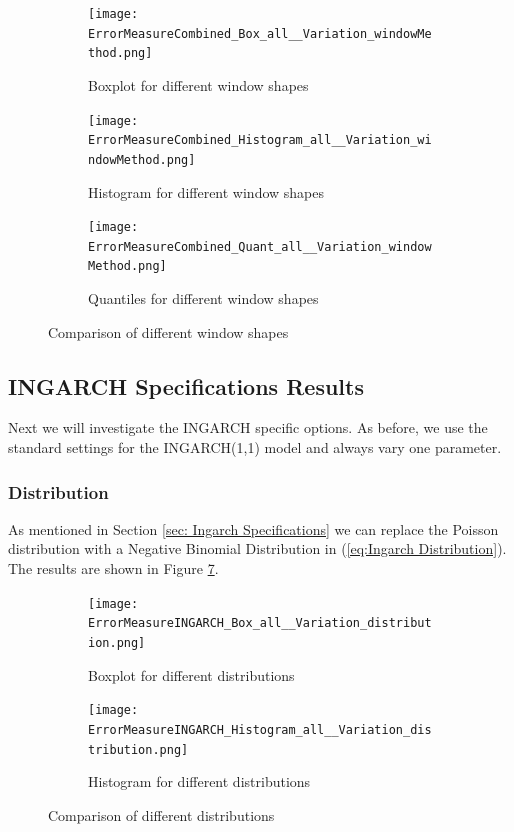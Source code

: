 \begin{figure}[htb!]
\centering
\begin{subfigure}[b]{0.45\textwidth}
\texttt{[image: ErrorMeasureCombined\_Box\_all\_\_Variation\_windowMethod.png]}
\caption{Boxplot for different window shapes}
\label{fig:window methods Box}
\end{subfigure}
\hfill
\begin{subfigure}[b]{0.45\textwidth}
\texttt{[image: ErrorMeasureCombined\_Histogram\_all\_\_Variation\_windowMethod.png]}
\caption{Histogram for different window shapes}
\label{fig:window methods Hist}
\end{subfigure}
\hfill
\begin{subfigure}[b]{0.8\textwidth}
\texttt{[image: ErrorMeasureCombined\_Quant\_all\_\_Variation\_windowMethod.png]}
\caption{Quantiles for different window shapes}
\label{fig:window methods Quant}
\end{subfigure}
\caption{Comparison of different window shapes}
\label{fig:window methods Comp1}
\end{figure}


\subsection{INGARCH Specifications Results}
\label{sec: Ingarch Specifications Results}

Next we will investigate the INGARCH specific options. As before, we use the standard settings for the INGARCH(1,1) model and always vary one parameter. 

\subsubsection{Distribution}
\label{sec:Distribution}

As mentioned in Section \ref{sec: Ingarch Specifications} we can replace the Poisson distribution with a Negative Binomial Distribution in (\ref{eq:Ingarch Distribution}). The results are shown in Figure \ref{fig:distributions Comp1}. 

\begin{figure}[htb!]
\centering
\begin{subfigure}[b]{0.45\textwidth}
\texttt{[image: ErrorMeasureINGARCH\_Box\_all\_\_Variation\_distribution.png]}
\caption{Boxplot for different distributions}
\label{fig:distributions Box}
\end{subfigure}
\hfill
\begin{subfigure}[b]{0.45\textwidth}
\texttt{[image: ErrorMeasureINGARCH\_Histogram\_all\_\_Variation\_distribution.png]}
\caption{Histogram for different distributions}
\label{fig:distributions Hist}
\end{subfigure}
\hfill
\caption{Comparison of different distributions}
\label{fig:distributions Comp1}
\end{figure}

